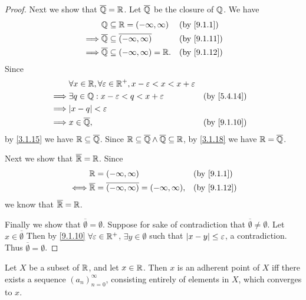 \begin{proof}
  Next we show that \(\overline{\mathbb{Q}} = \mathbb{R}\).
  Let \(\overline{\mathbb{Q}}\) be the closure of \(\mathbb{Q}\).
  We have
  \begin{align*}
             & \Q \subseteq \R = (-\infty, \infty)                  &  & \by{9.1.1}  \\
    \implies & \overline{\Q} \subseteq \overline{(-\infty, \infty)} &  & \by{9.1.11} \\
    \implies & \overline{\Q} \subseteq (-\infty, \infty) = \R.      &  & \by{9.1.12}
  \end{align*}
  Since
  \begin{align*}
             & \forall x \in \R, \forall \varepsilon \in \R^+, x - \varepsilon < x < x + \varepsilon                  \\
    \implies & \exists q \in \Q : x - \varepsilon < q < x + \varepsilon                              &  & \by{5.4.14} \\
    \implies & \abs{x - q} < \varepsilon                                                                              \\
    \implies & x \in \overline{\Q},                                                                  &  & \by{9.1.10}
  \end{align*}
  by \cref{3.1.15} we have \(\mathbb{R} \subseteq \overline{\mathbb{Q}}\).
  Since \(\mathbb{R} \subseteq \overline{\mathbb{Q}} \land \overline{\mathbb{Q}} \subseteq \mathbb{R}\), by \cref{3.1.18} we have \(\mathbb{R} = \overline{\mathbb{Q}}\).

  Next we show that \(\overline{\mathbb{R}} = \mathbb{R}\).
  Since
  \begin{align*}
         & \R = (-\infty, \infty)                                            &  & \by{9.1.1}  \\
    \iff & \overline{\R} = \overline{(-\infty, \infty)} = (-\infty, \infty), &  & \by{9.1.12}
  \end{align*}
  we know that \(\overline{\mathbb{R}} = \mathbb{R}\).

  Finally we show that \(\overline{\emptyset} = \emptyset\).
  Suppose for sake of contradiction that \(\overline{\emptyset} \neq \emptyset\).
  Let \(x \in \overline{\emptyset}\)
  Then by \cref{9.1.10} \(\forall \varepsilon \in \mathbb{R}^+\), \(\exists y \in \emptyset\) such that \(\left\lvert x - y\right\rvert \leq \varepsilon\), a contradiction.
  Thus \(\overline{\emptyset} = \emptyset\).
\end{proof}

\begin{lem}\label{9.1.14}
  Let \(X\) be a subset of \(\mathbb{R}\), and let \(x \in \mathbb{R}\).
  Then \(x\) is an adherent point of \(X\) iff there exists a sequence \((a_n)_{n = 0}^\infty\), consisting entirely of elements in \(X\), which converges to \(x\).
\end{lem}

